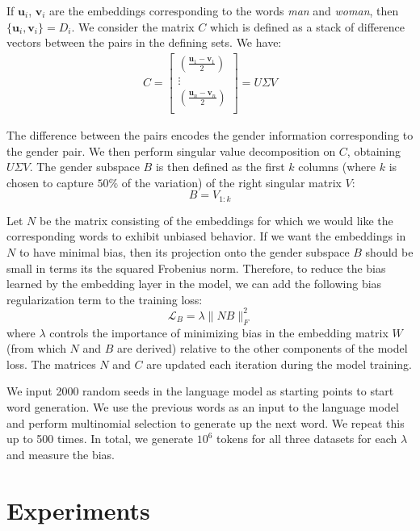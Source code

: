 \documentclass[11pt,a4paper]{article}
\begin{document}
    If $\mathbf{u}_i$, $\mathbf{v}_i$  are the embeddings corresponding to the words \textit{man} and \textit{woman}, then $\{\mathbf{u}_i, \mathbf{v}_i\} = D_i$.
We consider the matrix $C$ which is defined as a stack of difference vectors between the pairs in the defining sets. We have:
\begin{align*}
C = 
\begin{bmatrix}
    (\frac{\mathbf{u}_1 - \mathbf{v}_1}{2})\\%
    \vdots \\
    (\frac{\mathbf{u}_n - \mathbf{v}_n}{2})\\%
\end{bmatrix}
= U \Sigma V%
\end{align*}

The difference between the pairs encodes the gender information corresponding to the gender pair. We then perform singular value decomposition on $C$, obtaining $U \Sigma V$. The gender subspace $B$ is then defined as the first $k$ columns (where $k$ is chosen to capture $50\%$ of the variation) of the right singular matrix $V$: $$B = V_{1:k}$$

Let $N$ be the matrix consisting of the embeddings for which we would like the corresponding words to exhibit unbiased behavior. If we want the embeddings in $N$ to have minimal bias, then its projection onto the gender subspace $B$ should be small in terms its the squared Frobenius norm. Therefore, to reduce the bias learned by the embedding layer in the model, we can add the following bias regularization term to the training loss: 
$$ \mathcal{L}_B = \lambda \| N B \|_F^2$$
where $\lambda$ controls the importance of minimizing bias in the embedding matrix $W$ (from which $N$ and $B$ are derived) relative to the other components of the model loss. The matrices $N$ and $C$ are updated each iteration during the model training. 

We input 2000 random seeds in the language model as starting points to start word  generation. We use the previous words as an input to the language model and  perform multinomial selection  to generate up the next word. We repeat this up to 500 times. In total, we generate $10^{6}$ tokens for all three datasets for each $\lambda$ and measure the bias.



\section{Experiments}
\end{document}
